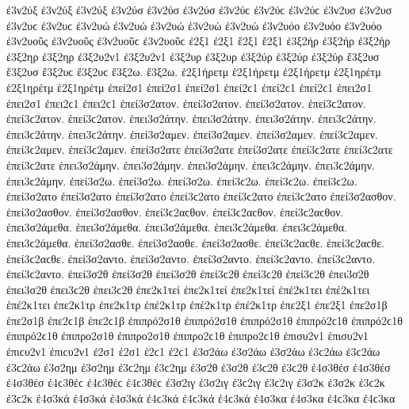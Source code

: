 {ἐ3ν2ύξ ἐ3ν2ύξ ἐ3ν2ύξ   %
ἐ3ν2ύσ ἐ3ν2ύσ ἐ3ν2ύσ ἐ3ν2ύϲ ἐ3ν2ύϲ ἐ3ν2ύϲ   %
ἐ3ν2υσ ἐ3ν2υσ ἐ3ν2υϲ ἐ3ν2υϲ 
ἐ3ν2υώ ἐ3ν2υώ ἐ3ν2υώ   %
ἐ3ν2υὼ ἐ3ν2υὼ 
ἐ3ν2υόο ἐ3ν2υόο ἐ3ν2υόο 
ἐ3ν2υοῦς ἐ3ν2υοῦς ἐ3ν2υοῦϲ ἐ3ν2υοῦϲ 
ἐ2ξ1 ἐ2ξ1 
ἔ2ξ1 ἔ2ξ1 
ἐ3ξ2ήρ ἐ3ξ2ήρ ἐ3ξ2ήρ   %
ἐ3ξ2ηρ ἐ3ξ2ηρ   %
ἐ3ξ2υ2ν1 ἐ3ξ2υ2ν1   %
ἐ3ξ2υρ ἐ3ξ2υρ   %
ἐ3ξ2ύρ ἐ3ξ2ύρ ἐ3ξ2ύρ   %
ἔ3ξ2υσ ἔ3ξ2υσ ἔ3ξ2υϲ ἔ3ξ2υϲ   %
ἔ3ξ2ω. ἔ3ξ2ω. 
ἑ2ξ1ήρετμ ἑ2ξ1ήρετμ ἑ2ξ1ήρετμ   %
ἑ2ξ1ηρέτμ ἑ2ξ1ηρέτμ ἑ2ξ1ηρέτμ 
ἐπεί2σ1 ἐπεί2σ1 ἐπεί2σ1 ἐπεί2ϲ1 ἐπεί2ϲ1 ἐπεί2ϲ1   %
ἐπει2σ1 ἐπει2σ1 ἐπει2ϲ1 ἐπει2ϲ1 
ἐπεί3σ2ατον. ἐπεί3σ2ατον. ἐπεί3σ2ατον. ἐπεί3ϲ2ατον. ἐπεί3ϲ2ατον. ἐπεί3ϲ2ατον.   %
ἐπει3σ2άτην. ἐπει3σ2άτην. ἐπει3σ2άτην. ἐπει3ϲ2άτην. ἐπει3ϲ2άτην. ἐπει3ϲ2άτην. 
ἐπεί3σ2αμεν. ἐπεί3σ2αμεν. ἐπεί3σ2αμεν. ἐπεί3ϲ2αμεν. ἐπεί3ϲ2αμεν. ἐπεί3ϲ2αμεν. 
ἐπεί3σ2ατε ἐπεί3σ2ατε ἐπεί3σ2ατε ἐπεί3ϲ2ατε ἐπεί3ϲ2ατε ἐπεί3ϲ2ατε 
ἐπει3σ2άμην. ἐπει3σ2άμην. ἐπει3σ2άμην. ἐπει3ϲ2άμην. ἐπει3ϲ2άμην. ἐπει3ϲ2άμην. 
ἐπεί3σ2ω. ἐπεί3σ2ω. ἐπεί3σ2ω. ἐπεί3ϲ2ω. ἐπεί3ϲ2ω. ἐπεί3ϲ2ω. 
ἐπεί3σ2ατο ἐπεί3σ2ατο ἐπεί3σ2ατο ἐπεί3ϲ2ατο ἐπεί3ϲ2ατο ἐπεί3ϲ2ατο 
ἐπεί3σ2ασθον. ἐπεί3σ2ασθον. ἐπεί3σ2ασθον. ἐπεί3ϲ2αϲθον. ἐπεί3ϲ2αϲθον. ἐπεί3ϲ2αϲθον. 
ἐπει3σ2άμεθα. ἐπει3σ2άμεθα. ἐπει3σ2άμεθα. ἐπει3ϲ2άμεθα. ἐπει3ϲ2άμεθα. ἐπει3ϲ2άμεθα. 
ἐπεί3σ2ασθε. ἐπεί3σ2ασθε. ἐπεί3σ2ασθε. ἐπεί3ϲ2αϲθε. ἐπεί3ϲ2αϲθε. ἐπεί3ϲ2αϲθε. 
ἐπεί3σ2αντο. ἐπεί3σ2αντο. ἐπεί3σ2αντο. ἐπεί3ϲ2αντο. ἐπεί3ϲ2αντο. ἐπεί3ϲ2αντο. 
ἐπεί3σ2θ ἐπεί3σ2θ ἐπεί3σ2θ ἐπεί3ϲ2θ ἐπεί3ϲ2θ ἐπεί3ϲ2θ   %
ἐπει3σ2θ ἐπει3σ2θ ἐπει3ϲ2θ ἐπει3ϲ2θ 
ἐπε2κ1τεί ἐπε2κ1τεί ἐπε2κ1τεί   %
ἐπέ2κ1τει ἐπέ2κ1τει ἐπέ2κ1τει 
ἐπε2κ1τρ ἐπε2κ1τρ   %
ἐπέ2κ1τρ ἐπέ2κ1τρ ἐπέ2κ1τρ 
ἐπε2ξ1 ἐπε2ξ1 
ἐπε2σ1β ἐπε2σ1β ἐπε2ϲ1β ἐπε2ϲ1β   %
ἐπιπρό2σ1θ ἐπιπρό2σ1θ ἐπιπρό2σ1θ ἐπιπρό2ϲ1θ ἐπιπρό2ϲ1θ ἐπιπρό2ϲ1θ   %
ἐπιπρο2σ1θ ἐπιπρο2σ1θ ἐπιπρο2ϲ1θ ἐπιπρο2ϲ1θ 
ἐπισυ2ν1 ἐπισυ2ν1 ἐπιϲυ2ν1 ἐπιϲυ2ν1   %
ἐ2σ1 ἐ2σ1 ἐ2ϲ1 ἐ2ϲ1 
ἐ3σ2άω ἐ3σ2άω ἐ3σ2άω ἐ3ϲ2άω ἐ3ϲ2άω ἐ3ϲ2άω   %
ἐ3σ2ημ ἐ3σ2ημ ἐ3ϲ2ημ ἐ3ϲ2ημ   %
ἐ3σ2θ ἐ3σ2θ ἐ3ϲ2θ ἐ3ϲ2θ   %
ἐ4σ3θέσ ἐ4σ3θέσ ἐ4σ3θέσ ἐ4ϲ3θέϲ ἐ4ϲ3θέϲ ἐ4ϲ3θέϲ   %
ἐ3σ2ιγ ἐ3σ2ιγ ἐ3ϲ2ιγ ἐ3ϲ2ιγ   %
ἐ3σ2κ ἐ3σ2κ ἐ3ϲ2κ ἐ3ϲ2κ 
ἐ4σ3κά ἐ4σ3κά ἐ4σ3κά ἐ4ϲ3κά ἐ4ϲ3κά ἐ4ϲ3κά   %
ἐ4σ3κα ἐ4σ3κα ἐ4ϲ3κα ἐ4ϲ3κα   %
}
